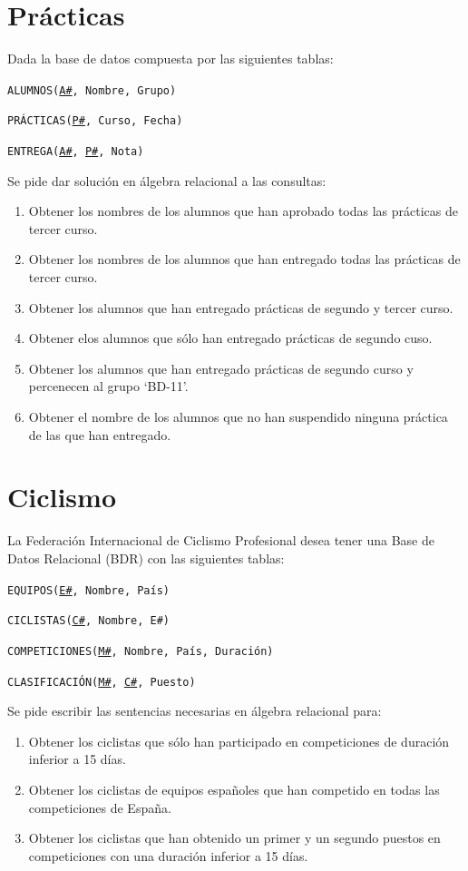 \documentclass[a4paper]{article}
\begin{document}
\section{Prácticas}

Dada la base de datos compuesta por las siguientes tablas:

\texttt{ALUMNOS(\underline{A\#}, Nombre, Grupo)}

\texttt{PRÁCTICAS(\underline{P\#}, Curso, Fecha)}

\texttt{ENTREGA(\underline{A\#}, \underline{P\#}, Nota)}

Se pide dar solución en álgebra relacional a las consultas:

\begin{enumerate}
    \item Obtener los nombres de los alumnos que han aprobado todas las prácticas de tercer curso.
    \item Obtener los nombres de los alumnos que han entregado todas las prácticas de tercer curso.
    \item Obtener los alumnos que han entregado prácticas de segundo y tercer curso.
    \item Obtener elos alumnos que sólo han entregado prácticas de segundo cuso.
    \item Obtener los alumnos que han entregado prácticas de segundo curso y percenecen al grupo `BD-11'.
    \item Obtener el nombre de los alumnos que no han suspendido ninguna práctica de las que han entregado.
\end{enumerate}

\section{Ciclismo}

La Federación Internacional de Ciclismo Profesional desea tener una Base de Datos Relacional (BDR) con las siguientes tablas:

\texttt{EQUIPOS(\underline{E\#}, Nombre, País)}

\texttt{CICLISTAS(\underline{C\#}, Nombre, E\#)}

\texttt{COMPETICIONES(\underline{M\#}, Nombre, País, Duración)}

\texttt{CLASIFICACIÓN(\underline{M\#}, \underline{C\#}, Puesto)}

Se pide escribir las sentencias necesarias en álgebra relacional para:

\begin{enumerate}
    \item Obtener los ciclistas que sólo han participado en competiciones de duración inferior a 15 días.
    \item Obtener los ciclistas de equipos españoles que han competido en todas las competiciones de España.
    \item Obtener los ciclistas que han obtenido un primer y un segundo puestos en competiciones con una duración inferior a 15 días.
\end{enumerate}
\end{document}
